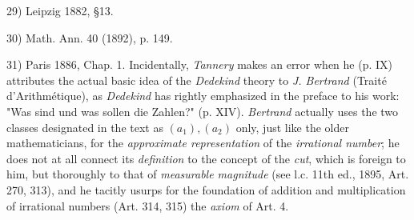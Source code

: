 \vfill
\leftline{\rule{2in}{0.4pt}}
\vspace{0.2cm}
{
\footnotesize
29) Leipzig 1882, §13.

30) Math. Ann. 40 (1892), p. 149.

31) Paris 1886, Chap. 1. Incidentally, \textit{Tannery} makes an error when he (p. IX) attributes the actual basic idea of the \textit{Dedekind} theory to \textit{J. Bertrand} (Traité d'Arithmétique), as \textit{Dedekind} has rightly emphasized in the preface to his work: "Was sind und was sollen die Zahlen?" (p. XIV). \textit{Bertrand} actually uses the two classes designated in the text as $(a_1), (a_2)$ only, just like the older mathematicians, for the \textit{approximate representation} of the \textit{irrational number}; he does not at all connect its \textit{definition} to the concept of the \textit{cut}, which is foreign to him, but thoroughly to that of \textit{measurable magnitude} (see l.c. 11th ed., 1895, Art. 270, 313), and he tacitly usurps for the foundation of addition and multiplication of irrational numbers (Art. 314, 315) the \textit{axiom} of Art. 4.

}